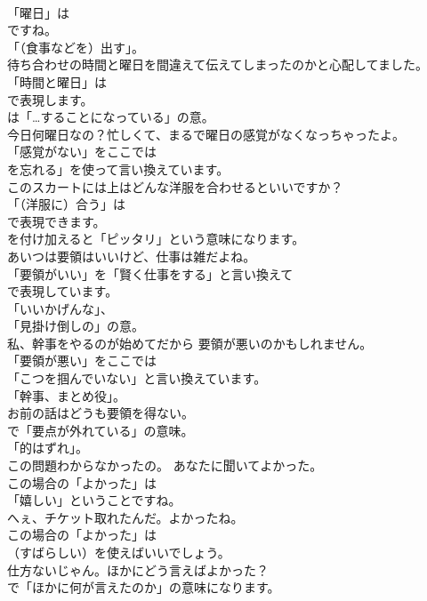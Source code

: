 \documentclass[8pt]{extreport}
\begin{document}
\begin{CJK}{UTF8}{min}
\\	「曜日」は
\\	ですね。
\\	「（食事などを）出す」。	
\\	待ち合わせの時間と曜日を間違えて伝えてしまったのかと心配してました。 
\\	「時間と曜日」は 
\\	で表現します。
\\	は「…することになっている」の意。	
\\	今日何曜日なの？忙しくて、まるで曜日の感覚がなくなっちゃったよ。 
\\	「感覚がない」をここでは
\\	を忘れる」を使って言い換えています。	
\\	このスカートには上はどんな洋服を合わせるといいですか？ 
\\	「（洋服に）合う」は
\\	で表現できます。
\\	を付け加えると「ピッタリ」という意味になります。	
\\	あいつは要領はいいけど、仕事は雑だよね。 
\\	「要領がいい」を「賢く仕事をする」と言い換えて
\\	で表現しています。
\\	「いいかげんな」、
\\	「見掛け倒しの」の意。	
\\	私、幹事をやるのが始めてだから 要領が悪いのかもしれません。 
\\	「要領が悪い」をここでは
\\	「こつを掴んでいない」と言い換えています。
\\	「幹事、まとめ役」。	
\\	お前の話はどうも要領を得ない。 
\\	で「要点が外れている」の意味。
\\	「的はずれ」。	
\\	この問題わからなかったの。 あなたに聞いてよかった。 
\\	この場合の「よかった」は
\\	「嬉しい」ということですね。	
\\	へぇ、チケット取れたんだ。よかったね。 
\\	この場合の「よかった」は 
\\	（すばらしい）を使えばいいでしょう。	
\\	仕方ないじゃん。ほかにどう言えばよかった？ 
\\	で「ほかに何が言えたのか」の意味になります。	

\end{CJK}
\end{document}
